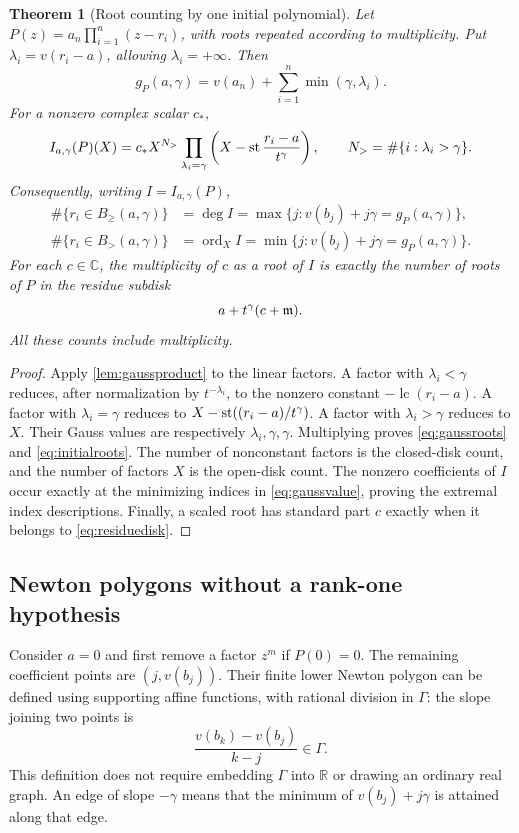 \documentclass[11pt,letterpaper,oneside]{article}
\numberwithin{equation}{section}
\newtheorem{theorem}{Theorem}[section]
\theoremstyle{definition}
\theoremstyle{remark}\newtheorem{remark}[theorem]{Remark}
\newcommand{\C}{\mathbb C}\newcommand{\R}{\mathbb R}\newcommand{\Q}{\mathbb Q}
\newcommand{\lc}{\operatorname{lc}}\newcommand{\ord}{\operatorname{ord}}
\newcommand{\Bcl}{B_{\geq}}\newcommand{\Bop}{B_{>}}
\begin{document}
\begin{theorem}[Root counting by one initial polynomial]\label{thm:initialcount}
Let $P(z)=a_n\prod_{i=1}^n(z-r_i)$, with roots repeated according to
multiplicity. Put $\lambda_i=v(r_i-a)$, allowing $\lambda_i=+\infty$.
Then
\begin{equation}\label{eq:gaussroots}
 g_P(a,\gamma)=v(a_n)+\sum_{i=1}^n\min(\gamma,\lambda_i).
\end{equation}
For a nonzero complex scalar $c_*$,
\begin{equation}\label{eq:initialroots}
 I_{a,\gamma}(P)(X)
 =c_*X^{N_>}\prod_{\lambda_i=\gamma}
 \left(X-\operatorname{st}\frac{r_i-a}{t^\gamma}\right),
 \qquad N_>=\#\{i:\lambda_i>\gamma\}.
\end{equation}
Consequently, writing $I=I_{a,\gamma}(P)$,
\begin{align}
 \#\{r_i\in\Bcl(a,\gamma)\}&=\deg I
 =\max\{j:v(b_j)+j\gamma=g_P(a,\gamma)\},\label{eq:closedcount}\\
 \#\{r_i\in\Bop(a,\gamma)\}&=\ord_X I
 =\min\{j:v(b_j)+j\gamma=g_P(a,\gamma)\}.\label{eq:opencount}
\end{align}
For each $c\in\C$, the multiplicity of $c$ as a root of $I$ is exactly
the number of roots of $P$ in the residue subdisk
\begin{equation}\label{eq:residuedisk}
 a+t^\gamma(c+\mathfrak m).
\end{equation}
All these counts include multiplicity.
\end{theorem}
\begin{proof}
Apply \cref{lem:gaussproduct} to the linear factors. A factor with
$\lambda_i<\gamma$ reduces, after normalization by $t^{-\lambda_i}$,
to the nonzero constant $-\lc(r_i-a)$. A factor with
$\lambda_i=\gamma$ reduces to $X-\operatorname{st}((r_i-a)/t^\gamma)$.
A factor with $\lambda_i>\gamma$ reduces to $X$. Their Gauss values are
respectively $\lambda_i,\gamma,\gamma$. Multiplying proves
\eqref{eq:gaussroots} and \eqref{eq:initialroots}. The number of
nonconstant factors is the closed-disk count, and the number of factors
$X$ is the open-disk count. The nonzero coefficients of $I$ occur exactly
at the minimizing indices in \eqref{eq:gaussvalue}, proving the extremal
index descriptions. Finally, a scaled root has standard part $c$ exactly
when it belongs to \eqref{eq:residuedisk}.
\end{proof}

\subsection{Newton polygons without a rank-one hypothesis}
Consider $a=0$ and first remove a factor $z^m$ if $P(0)=0$. The remaining
coefficient points are $(j,v(b_j))$. Their finite lower Newton polygon
can be defined using supporting affine functions, with rational division
in $\Gamma$: the slope joining two points is
\[
 \frac{v(b_k)-v(b_j)}{k-j}\in\Gamma.
\]
This definition does not require embedding $\Gamma$ into $\R$ or drawing
an ordinary real graph. An edge of slope $-\gamma$ means that the
minimum of $v(b_j)+j\gamma$ is attained along that edge.
\end{document}

